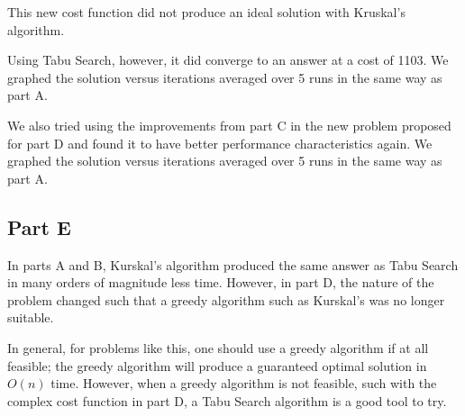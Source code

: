 \documentclass[a4paper]{article}
\begin{document}
This new cost function did not produce an ideal solution with Kruskal's algorithm.

Using Tabu Search, however, it did converge to an answer at a cost of 1103. We graphed the solution versus iterations averaged over 5 runs in the same way as part A.


We also tried using the improvements from part C in the new problem proposed for part D and found it to have better performance characteristics again. We graphed the solution versus iterations averaged over 5 runs in the same way as part A.



\subsection{Part E}


In parts A and B, Kurskal's algorithm produced the same answer as Tabu Search in many orders of magnitude less time. However, in part D, the nature of the problem changed such that a greedy algorithm such as Kurskal's was no longer suitable.

In general, for problems like this, one should use a greedy algorithm if at all feasible; the greedy algorithm will produce a guaranteed optimal solution in $O(n)$ time. However, when a greedy algorithm is not feasible, such with the complex cost function in part D, a Tabu Search algorithm is a good tool to try.
\end{document}
